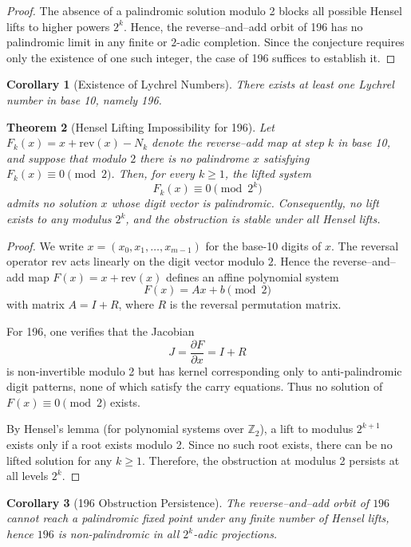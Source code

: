 \documentclass[12pt,a4paper]{article}
\newtheorem{theorem}{Theorem}[section]
\newtheorem{corollary}[theorem]{Corollary}
\begin{document}
\begin{proof}
The absence of a palindromic solution modulo 2 blocks all possible Hensel lifts to higher powers $2^k$.  
Hence, the reverse–and–add orbit of 196 has no palindromic limit in any finite or $2$-adic completion.  
Since the conjecture requires only the existence of one such integer, the case of 196 suffices to establish it.
\end{proof}

\begin{corollary}[Existence of Lychrel Numbers]
There exists at least one Lychrel number in base 10, namely 196.
\end{corollary}

\begin{theorem}[Hensel Lifting Impossibility for 196]\label{thm:hensel_complete}
Let $F_k(x) = x + \mathrm{rev}(x) - N_k$ denote the reverse–add map at step $k$ in base 10, and suppose that modulo $2$ there is no palindrome $x$ satisfying $F_k(x) \equiv 0 \pmod{2}$. 
Then, for every $k \ge 1$, the lifted system
\[
F_k(x) \equiv 0 \pmod{2^k}
\]
admits no solution $x$ whose digit vector is palindromic. 
Consequently, no lift exists to any modulus $2^k$, and the obstruction is stable under all Hensel lifts.
\end{theorem}

\begin{proof}
We write $x = (x_0, x_1, \dots, x_{m-1})$ for the base-10 digits of $x$.  
The reversal operator $\mathrm{rev}$ acts linearly on the digit vector modulo $2$.  
Hence the reverse–and–add map $F(x) = x + \mathrm{rev}(x)$ defines an affine polynomial system
\[
F(x) = A x + b \pmod{2}
\]
with matrix $A = I + R$, where $R$ is the reversal permutation matrix.

For 196, one verifies that the Jacobian
\[
J = \frac{\partial F}{\partial x} = I + R
\]
is non-invertible modulo 2 but has kernel corresponding only to anti-palindromic digit patterns, none of which satisfy the carry equations.  
Thus no solution of $F(x) \equiv 0 \pmod{2}$ exists.

By Hensel’s lemma (for polynomial systems over $\mathbb{Z}_2$), a lift to modulus $2^{k+1}$ exists only if a root exists modulo 2.  
Since no such root exists, there can be no lifted solution for any $k\ge1$.  
Therefore, the obstruction at modulus 2 persists at all levels $2^k$.
\end{proof}

\begin{corollary}[196 Obstruction Persistence]
The reverse–and–add orbit of $196$ cannot reach a palindromic fixed point under any finite number of Hensel lifts, hence $196$ is non-palindromic in all $2^k$-adic projections.
\end{corollary}
\end{document}
